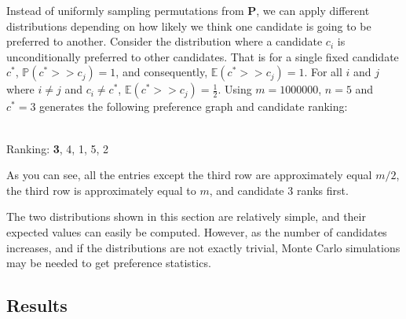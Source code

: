 \documentclass[final,5p,times,twocolumn,authoryear, 10pt]{elsarticle}
\begin{document}
Instead of uniformly sampling permutations from $\mathbf{P}$, we can apply
different distributions depending on how likely we think one candidate is going
to be preferred to another. Consider the distribution where a candidate $c_i$
is unconditionally preferred to other candidates. That is for a single fixed
candidate $c^*$, $\mathds{P}(c^* >> c_j) = 1$, and consequently,
$\mathbb{E}(c^* >> c_j) = 1$. For all $i$ and $j$ where $i \neq j$ and $c_i
\neq c^*$, $\mathbb{E}(c^* >> c_j) = \frac{1}{2}$. Using $m=1000000$, $n=5$ and
$c^* = 3$ generates the following preference graph and candidate ranking:
\begin{center}
 \\ 
\vspace*{.2cm}
Ranking: \textbf{3}, 4, 1, 5, 2
\end{center}
As you can see, all the entries except the third row are approximately equal
$m/2$, the third row is approximately equal to $m$, and candidate 3 ranks
first.

The two distributions shown in this section are relatively simple, and their
expected values can easily be computed. However, as the number of candidates
increases, and if the distributions are not exactly trivial, Monte Carlo
simulations may be needed to get preference statistics.

\subsection{Results}
\label{Results2}
\end{document}
